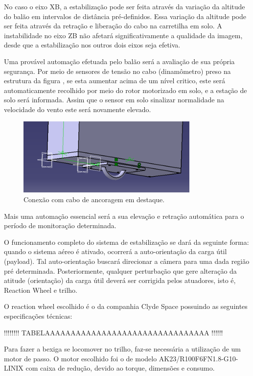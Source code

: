 No caso o eixo XB, a estabilização pode ser feita através da variação da altitude do balão em intervalos de distância pré-definidos. Essa variação da altitude pode ser feita através da retração e liberação do cabo na carretilha em solo. A instabilidade no eixo ZB não afetará significativamente a qualidade da imagem, desde que a estabilização nos outros dois eixos seja efetiva.

Uma provável automação efetuada pelo balão será a avaliação de sua própria segurança. Por meio de sensores de tensão no cabo (dinamômetro) preso na estrutura da figura \label{img:caboancoragem}, se esta aumentar acima de um nível critico, este será automaticamente recolhido por meio do rotor motorizado em solo, e a estação de solo será informada. Assim que o sensor em solo sinalizar normalidade na velocidade do vento este será novamente elevado.

\begin{figure}[H]
  \centering
  \includegraphics[width=0.8\textwidth]{figuras/e3}
  \caption{Conexão com cabo de ancoragem em destaque.}
  \label{img:caboancoragem}
\end{figure}


Mais uma automação essencial será a sua elevação e retração automática para o período de monitoração determinada.

O funcionamento completo do sistema de estabilização se dará da seguinte forma: quando o sistema aéreo é ativado, ocorrerá a auto-orientação da carga útil (payload). Tal auto-orientação buscará direcionar a câmera para uma dada região pré determinada. Posteriormente, qualquer perturbação que gere alteração da atitude (orientação) da carga útil deverá ser corrigida pelos atuadores, isto é, Reaction Wheel e trilho.

O reaction wheel escolhido é o da companhia Clyde Space possuindo as seguintes especificações técnicas:

!!!!!!!! TABELAAAAAAAAAAAAAAAAAAAAAAAAAAAAAAAA !!!!!!

Para fazer a bexiga se locomover no trilho, faz-se necessária a utilização de um motor de passo. O motor escolhido foi o de modelo AK23/R100F6FN1.8-G10-LINIX com caixa de redução, devido ao torque, dimensões e consumo.

